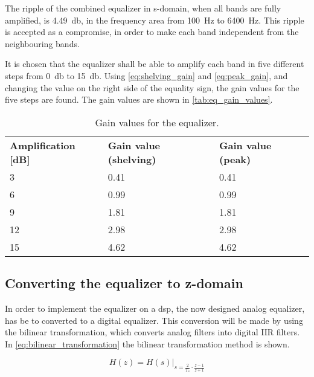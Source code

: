 The ripple of the combined equalizer in s-domain, when all bands are fully amplified, is \SI{4.49}{\decibel}, in the frequency area from \SI{100}{\hertz} to \SI{6400}{\hertz}. This ripple is accepted as a compromise, in order to make each band independent from the neighbouring bands. 

It is chosen that the equalizer shall be able to amplify each band in five different steps from \SI{0}{\decibel} to \SI{15}{\decibel}. Using \autoref{eq:shelving_gain} and \autoref{eq:peak_gain}, and changing the value on the right side of the equality sign, the gain values for the five steps are found. The gain values are shown in \autoref{tab:eq_gain_values}. 

\begin{table}[htbp]
\centering
\caption{Gain values for the equalizer.}
\label{tab:eq_gain_values}
\begin{tabular}{|l|l|l|}
\cline{1-3}
\textbf{Amplification [dB]} & \textbf{Gain value (shelving)} & \textbf{Gain value (peak)} \\ \cline{1-3} 
3 & 0.41 & 0.41 \\  \cline{1-3} 
6 & 0.99 & 0.99 \\ \cline{1-3} 
9 & 1.81 & 1.81 \\ \cline{1-3} 
12 & 2.98 & 2.98 \\ \cline{1-3} 
15 & 4.62 & 4.62 \\ \cline{1-3} 
\end{tabular}
\end{table}

\subsection{Converting the equalizer to z-domain}
In order to implement the equalizer on a \gls{dsp}, the now designed analog equalizer, has be to converted to a digital equalizer. This conversion will be made by using the bilinear transformation, which converts analog filters into digital IIR filters. In \autoref{eq:bilinear_transformation} the bilinear transformation method is shown.

\begin{equation}\label{eq:bilinear_transformation}
        H(z) = H(s) \Big|_{s = \frac{2}{T_s} \cdot \frac{z-1}{z+1}}
    \end{equation}
    
    \startexplain
    \stopexplain
    
